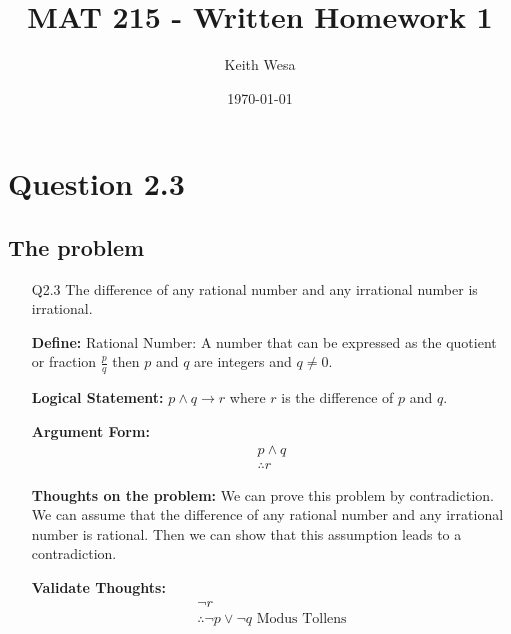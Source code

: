 \documentclass{article}
\author{Keith Wesa}
\title{MAT 215 - Written Homework 1}
\date{\today}
\begin{document}
\section*{Question 2.3}
\subsection*{The problem}
\begin{itemize}
    \item[Q2.3] The difference of any rational number and any irrational number is irrational.
    \item[] \textbf{Define: } Rational Number: A number that can be expressed as the quotient or fraction $\frac{p}{q}$
    then $p$ and $q$ are integers and $q \neq 0$. 
    \item[] \textbf{Logical Statement:} $p \land q \rightarrow r$ where $r$ is the difference of $p$ and $q$. 
    \item[] \textbf{Argument Form: }
    \begin{equation*}
        \begin{array}{c}    
            p \land q \\
            \hline
            \therefore r
        \end{array}
    \end{equation*}
    \item[] \textbf{Thoughts on the problem: } We can prove this problem by contradiction. We can assume that the difference of any rational number and any irrational number is rational. 
    Then we can show that this assumption leads to a contradiction.
    \item[] \textbf{Validate Thoughts:}
    \begin{equation*}
        \begin{array}{c}    
            \lnot r \\
            \hline 
            \therefore \lnot p \lor \lnot q \text{ Modus Tollens}
        \end{array}
    \end{equation*}
\end{itemize}
\end{document}

